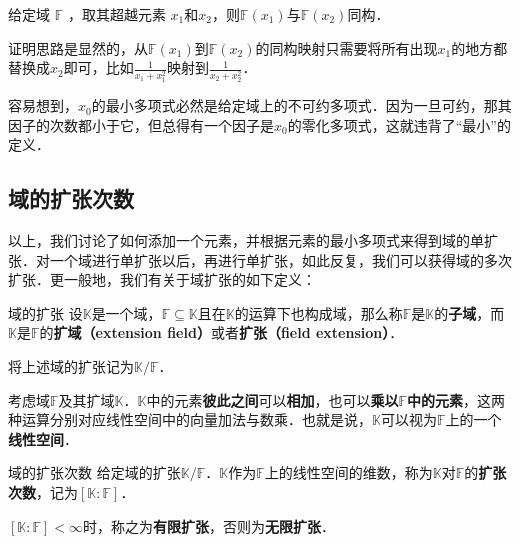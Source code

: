  


\begin{theorem}{}
给定域 $\mathbb{F}$ ，取其超越元素 $x_1$和$x_2$，则$\mathbb{F}(x_1)$与$\mathbb{F}(x_2)$同构．
\end{theorem}

证明思路是显然的，从$\mathbb{F}(x_1)$到$\mathbb{F}(x_2)$的同构映射只需要将所有出现$x_1$的地方都替换成$x_2$即可，比如$\frac{1}{x_1+x_1^2}$映射到$\frac{1}{x_2+x_2^2}$．

容易想到，$x_0$的最小多项式必然是给定域上的不可约多项式．因为一旦可约，那其因子的次数都小于它，但总得有一个因子是$x_0$的零化多项式，这就违背了“最小”的定义．




\subsection{域的扩张次数}

以上，我们讨论了如何添加一个元素，并根据元素的最小多项式来得到域的单扩张．对一个域进行单扩张以后，再进行单扩张，如此反复，我们可以获得域的多次扩张．更一般地，我们有关于域扩张的如下定义：

\begin{definition}{域的扩张}
设$\mathbb{K}$是一个域，$\mathbb{F}\subseteq \mathbb{K}$且在$\mathbb{K}$的运算下也构成域，那么称$\mathbb{F}$是$\mathbb{K}$的\textbf{子域}，而$\mathbb{K}$是$\mathbb{F}$的\textbf{扩域（extension field）}或者\textbf{扩张（field extension）}．

将上述域的扩张记为$\mathbb{K}/\mathbb{F}$．
\end{definition}

考虑域$\mathbb{F}$及其扩域$\mathbb{K}$．$\mathbb{K}$中的元素\textbf{彼此之间}可以\textbf{相加}，也可以\textbf{乘以}$\mathbb{F}$\textbf{中的元素}，这两种运算分别对应线性空间中的向量加法与数乘．也就是说，$\mathbb{K}$可以视为$\mathbb{F}$上的一个\textbf{线性空间}．

\begin{definition}{域的扩张次数}
给定域的扩张$\mathbb{K}/\mathbb{F}$．$\mathbb{K}$作为$\mathbb{F}$上的线性空间的维数，称为$\mathbb{K}$对$\mathbb{F}$的\textbf{扩张次数}，记为$[\mathbb{K}:\mathbb{F}]$．

$[\mathbb{K}:\mathbb{F}]<\infty$时，称之为\textbf{有限扩张}，否则为\textbf{无限扩张}．
\end{definition}


